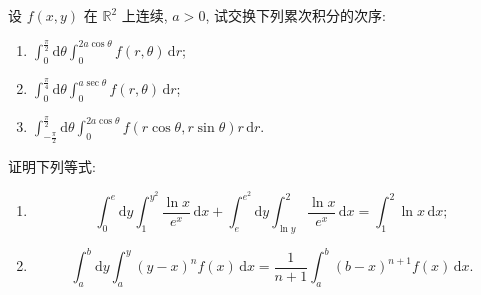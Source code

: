 \documentclass[../数学分析培优讲义.tex]{subfiles}
\begin{document}
\begin{example}[\markstar]
设 $f(x,y)$ 在 $\mathbb{R}^2$ 上连续, $a>0$, 试交换下列累次积分的次序:
\begin{enumerate}[label=(\arabic*)]
    \item $\displaystyle\int_0^{\frac{\pi}{2}}\mathrm{d}\theta\int_0^{2a\cos\theta}f(r,\theta)\,\mathrm{d}r$;
    \item $\displaystyle\int_0^{\frac{\pi}{4}}\mathrm{d}\theta\int_0^{a\sec\theta}f(r,\theta)\,\mathrm{d}r$;
    \item $\displaystyle\int_{-\frac{\pi}{2}}^{\frac{\pi}{2}}\mathrm{d}\theta\int_0^{2a\cos\theta}f(r\cos\theta,r\sin\theta)r\,\mathrm{d}r$.
\end{enumerate}
\end{example}
\exampleblank

\begin{example}
证明下列等式:
\begin{enumerate}[label=(\arabic*)]
    \item
    \[
        \int_0^e\mathrm{d}y\int_1^{y^2}\dfrac{\ln x}{e^x}\,\mathrm{d}x
        +\int_e^{e^2}\mathrm{d}y\int_{\ln y}^{2}\dfrac{\ln x}{e^x}\,\mathrm{d}x
        =\int_1^2\ln x\,\mathrm{d}x;
    \]
    \item
    \[
        \int_a^b\mathrm{d}y\int_a^y(y-x)^n f(x)\,\mathrm{d}x
        =\dfrac{1}{n+1}\int_a^b(b-x)^{n+1}f(x)\,\mathrm{d}x.
    \]
\end{enumerate}
\end{example}
\exampleblank
\end{document}

